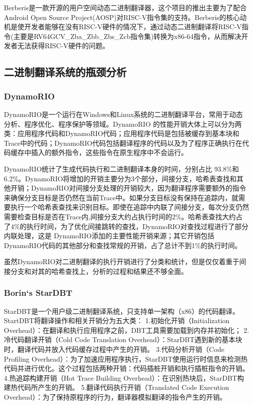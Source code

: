 Berberis是一款开源的用户空间动态二进制翻译器，这个项目的推出主要为了配合Android Open Source Project(AOSP)对RISC-V指令集的支持。Berberis的核心动机是使开发者能够在没有RISC-V硬件的情况下，通过动态二进制翻译将RISC-V指令(主要是RV64GCV\_Zba\_Zbb\_Zbs\_Zcb指令集)转换为x86-64指令，从而解决开发者无法获得RISC-V硬件的问题。

\subsection{二进制翻译系统的瓶颈分析}
\subsubsection{DynamoRIO}
DynamoRIO是一个运行在Windows和Linux系统的二进制翻译平台，常用于动态分析、程序优化、程序保护等领域。DynamoRIO 的性能开销大体上可以分为两类：应用程序代码和DynamoRIO代码；应用程序代码是包括被缓存到基本块和Trace中的代码；DynamoRIO代码包括翻译程序的代码以及为了程序正确执行在代码缓存中插入的额外指令，这些指令在原生程序中不会运行。

DynamoRIO统计了生成代码执行和二进制翻译本身的时间，分别占比 93.8{\%}和6.2{\%}。DynamoRIO将增加的开销主要分为3个部分，间接分支，哈希表查找和其他开销；DynamoRIO对间接分支处理的开销较大，因为翻译程序需要额外的指令来确保分支目标是否仍然在当前Trace中。如果分支目标没有保持在追踪内，就需要执行一个哈希表查找来识别目标。即使在追踪中内联了间接分支，每次分支仍然需要检查目标是否在Trace内,间接分支大约占执行时间的2{\%}。哈希表查找大约占了4{\%}的执行时间，为了优化间接跳转的查找，DynamoRIO对查找过程进行了部分内联处理，这是 DynamoRIO添加的主要性能开销来源；其它开销包括DynamoRIO代码的其他部分和查找常规的开销，占了总计不到1{\%}的执行时间。

虽然DynamoRIO对二进制翻译的执行开销进行了分类和统计，但是仅仅着重于间接分支和对其的哈希查找上，分析的过程和结果还不够全面。

\subsubsection{Borin‘s StarDBT}
StarDBT是一个用户级二进制翻译系统，只支持单一架构（x86）的代码翻译。StartDBT将翻译操作和相关开销分为五大类：
1.初始化开销（Initialization Overhead）：在翻译和执行应用程序之前，DBT工具需要加载到内存并初始化；
2.冷代码翻译开销（Cold Code Translation Overhead）：StarDBT遇到新的基本块时，翻译代码并放入代码缓存过程中产生的开销。
3.代码分析开销（Code Profiling Overhead）：为了加速应用程序执行，StarDBT使用运行时信息来检测热代码并进行优化。这个过程包括两种开销：代码插桩开销和执行插桩指令的开销。
4.热追踪构建开销（Hot Trace Building Overhead）：在识别热块后，StarDBT构建热代码所产生的开销。
5.翻译代码执行开销（Translated Code Execution Overhead）：为了保持原程序的行为，翻译器模拟翻译的指令产生的开销。

